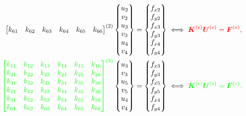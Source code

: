 \begin{align}
\begin{bmatrix}
        k_{61} & k_{62} & k_{63} & k_{64} & k_{65} & k_{66} \\
    \end{bmatrix}^{(2)}
    \color{black}
    \begin{Bmatrix}
        u_2 \\ v_2 \\ u_3 \\ v_3 \\ u_4 \\ v_4
    \end{Bmatrix}
    &=
    \begin{Bmatrix}
        f_{x2} \\ f_{y2} \\ f_{x3} \\ f_{y3} \\ f_{x4} \\ f_{y4}
    \end{Bmatrix} \iff \color{red} \bm{K}^{(e)} \bm{U}^{(e)} = \bm{F}^{(e)}, \\
    \color{green} \begin{bmatrix}
        k_{11} & k_{12} & k_{13} & k_{14} & k_{15} & k_{16} \\
        k_{21} & k_{22} & k_{23} & k_{24} & k_{25} & k_{26} \\
        k_{31} & k_{32} & k_{33} & k_{34} & k_{35} & k_{36} \\
        k_{41} & k_{42} & k_{43} & k_{44} & k_{45} & k_{46} \\
        k_{51} & k_{52} & k_{53} & k_{54} & k_{55} & k_{56} \\
        k_{61} & k_{62} & k_{63} & k_{64} & k_{65} & k_{66} \\
    \end{bmatrix}^{(3)}
    \color{black}
    \begin{Bmatrix}
        u_3 \\ v_3 \\ u_5 \\ v_5 \\ u_4 \\ v_4
    \end{Bmatrix}
    &=
    \begin{Bmatrix}
        f_{x3} \\ f_{y3} \\ f_{x5} \\ f_{y5} \\ f_{x4} \\ f_{y4}
    \end{Bmatrix} \iff \color{green} \bm{K}^{(e)} \bm{U}^{(e)} = \bm{F}^{(e)}.
\end{align}

